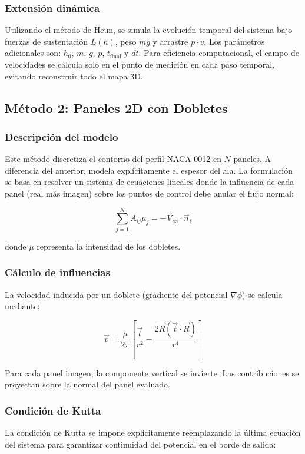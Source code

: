 \documentclass[twocolumn]{article}
\begin{document}
\subsubsection{Extensión dinámica}
Utilizando el método de Heun, se simula la evolución temporal del sistema bajo fuerzas de sustentación $L(h)$, peso $mg$ y arrastre $p \cdot v$. Los parámetros adicionales son: $h_0$, $m$, $g$, $p$, $t_{\text{final}}$ y $dt$. Para eficiencia computacional, el campo de velocidades se calcula solo en el punto de medición en cada paso temporal, evitando reconstruir todo el mapa 3D.

\subsection{Método 2: Paneles 2D con Dobletes}

\subsubsection{Descripción del modelo}
Este método discretiza el contorno del perfil NACA 0012 en $N$ paneles. A diferencia del anterior, modela explícitamente el espesor del ala. La formulación se basa en resolver un sistema de ecuaciones lineales donde la influencia de cada panel (real más imagen) sobre los puntos de control debe anular el flujo normal:

\begin{equation}
\sum_{j=1}^{N} A_{ij} \mu_j = -\vec{V}_{\infty} \cdot \vec{n}_i
\end{equation}

donde $\mu$ representa la intensidad de los dobletes.

\subsubsection{Cálculo de influencias}
La velocidad inducida por un doblete (gradiente del potencial $\nabla \phi$) se calcula mediante:

\begin{equation}
\vec{v} = \frac{\mu}{2\pi} \left[ \frac{\vec{t}}{r^2} - \frac{2\vec{R}(\vec{t}\cdot\vec{R})}{r^4} \right]
\end{equation}

Para cada panel imagen, la componente vertical se invierte. Las contribuciones se proyectan sobre la normal del panel evaluado.

\subsubsection{Condición de Kutta}
La condición de Kutta se impone explícitamente reemplazando la última ecuación del sistema para garantizar continuidad del potencial en el borde de salida:
\end{document}
